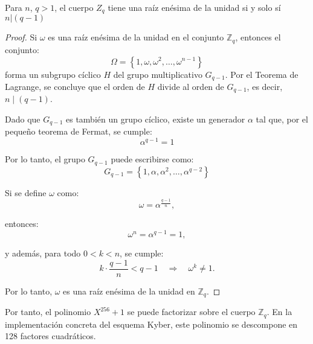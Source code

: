 \begin{theorem}
	Para \(n\), \(q>1\), el cuerpo  \(Z_q\) tiene una raíz enésima de la unidad si y solo sí \(n| (q-1)\)
\end{theorem} 
\begin{proof}
	Si \(\omega\) es una raíz enésima de la unidad en el conjunto \( \mathbb{Z}_q \), entonces el conjunto:
	\begin{equation}
		\Omega = \left\{1, \omega, \omega^2, \dots, \omega^{n-1} \right\}
	\end{equation}
	forma un subgrupo cíclico \( H \) del grupo multiplicativo \( G_{q-1} \). Por el Teorema de Lagrange, se concluye que el orden de \( H \) divide al orden de \( G_{q-1} \), es decir, \( n \mid (q-1) \).
	\newline
	
	Dado que \( G_{q-1} \) es también un grupo cíclico, existe un generador \(\alpha\) tal que, por el pequeño teorema de Fermat, se cumple:
	\begin{equation}
		\alpha^{q-1} = 1
	\end{equation}
	
	Por lo tanto, el grupo \( G_{q-1} \) puede escribirse como:
	\begin{equation}
		G_{q-1} = \left\{1, \alpha, \alpha^2, \dots, \alpha^{q-2} \right\}
	\end{equation}
	
	Si se define \(\omega\) como:
	\begin{equation}
		\omega = \alpha^{\frac{q-1}{n}},
	\end{equation}
	
	entonces:
	\begin{equation}
		\omega^n = \alpha^{q-1} = 1,
	\end{equation}
	
	y además, para todo \( 0 < k < n \), se cumple:
	\begin{equation}
		k \cdot \frac{q-1}{n} < q-1 \quad \Rightarrow \quad \omega^k \neq 1.
	\end{equation}
	
	Por lo tanto, \(\omega\) es una raíz enésima de la unidad en \(\mathbb{Z}_q\).
\end{proof}
\newpage

Por tanto, el polinomio \(X^{256} + 1\) se puede factorizar sobre el cuerpo \(\mathbb{Z}_q\). En la implementación concreta del esquema Kyber, este polinomio se descompone en 128 factores cuadráticos.
\newline


